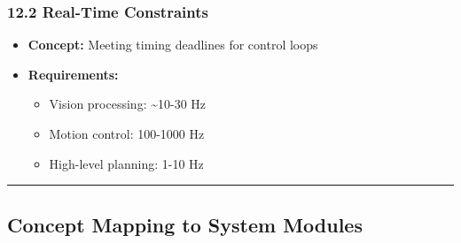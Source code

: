 \documentclass[
]{article}
\providecommand{\tightlist}{%
  \setlength{\itemsep}{0pt}\setlength{\parskip}{0pt}}
\begin{document}
\hypertarget{real-time-constraints}{%
\subsubsection{12.2 Real-Time Constraints}\label{real-time-constraints}}

\begin{itemize}
\tightlist
\item
  \textbf{Concept:} Meeting timing deadlines for control loops
\item
  \textbf{Requirements:}

  \begin{itemize}
  \tightlist
  \item
    Vision processing: \textasciitilde10-30 Hz
  \item
    Motion control: 100-1000 Hz
  \item
    High-level planning: 1-10 Hz
  \end{itemize}
\end{itemize}

\begin{center}\rule{0.5\linewidth}{0.5pt}\end{center}

\hypertarget{concept-mapping-to-system-modules}{%
\subsection{Concept Mapping to System
Modules}\label{concept-mapping-to-system-modules}}
\end{document}
